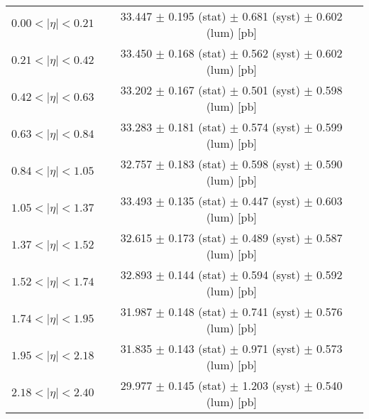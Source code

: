 \begin{tabular}{lc}
\hline
$0.00 < |\eta| <0.21$          & 33.447 $\pm$ 0.195 (stat) $\pm$ 0.681 (syst) $\pm$ 0.602 (lum) [pb]  \\
$0.21 < |\eta| <0.42$          & 33.450 $\pm$ 0.168 (stat) $\pm$ 0.562 (syst) $\pm$ 0.602 (lum) [pb]  \\
$0.42 < |\eta| <0.63$          & 33.202 $\pm$ 0.167 (stat) $\pm$ 0.501 (syst) $\pm$ 0.598 (lum) [pb]  \\
$0.63 < |\eta| <0.84$          & 33.283 $\pm$ 0.181 (stat) $\pm$ 0.574 (syst) $\pm$ 0.599 (lum) [pb]  \\
$0.84 < |\eta| <1.05$          & 32.757 $\pm$ 0.183 (stat) $\pm$ 0.598 (syst) $\pm$ 0.590 (lum) [pb]  \\
$1.05 < |\eta| <1.37$          & 33.493 $\pm$ 0.135 (stat) $\pm$ 0.447 (syst) $\pm$ 0.603 (lum) [pb]  \\
$1.37 < |\eta| <1.52$          & 32.615 $\pm$ 0.173 (stat) $\pm$ 0.489 (syst) $\pm$ 0.587 (lum) [pb]  \\
$1.52 < |\eta| <1.74$          & 32.893 $\pm$ 0.144 (stat) $\pm$ 0.594 (syst) $\pm$ 0.592 (lum) [pb]  \\
$1.74 < |\eta| <1.95$          & 31.987 $\pm$ 0.148 (stat) $\pm$ 0.741 (syst) $\pm$ 0.576 (lum) [pb]  \\
$1.95 < |\eta| <2.18$          & 31.835 $\pm$ 0.143 (stat) $\pm$ 0.971 (syst) $\pm$ 0.573 (lum) [pb]  \\
$2.18 < |\eta| <2.40$          & 29.977 $\pm$ 0.145 (stat) $\pm$ 1.203 (syst) $\pm$ 0.540 (lum) [pb]  \\
\hline
\end{tabular}
